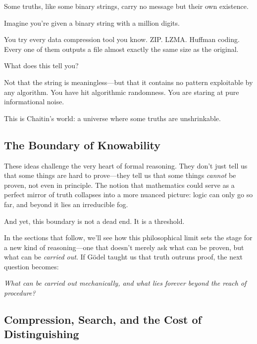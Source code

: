 Some truths, like some binary strings, carry no message but their own existence.

\begin{tcolorbox}[colback=gray!5!white, colframe=black!75!white, title={Compression Test: A Thought Experiment}]
Imagine you're given a binary string with a million digits.

You try every data compression tool you know. ZIP. LZMA. Huffman coding. Every one of them outputs a file almost exactly the same size as the original.

What does this tell you?

Not that the string is meaningless—but that it contains no pattern exploitable by any algorithm. You have hit algorithmic randomness. You are staring at pure informational noise.

This is Chaitin’s world: a universe where some truths are unshrinkable.
\end{tcolorbox}


\subsection{The Boundary of Knowability}

These ideas challenge the very heart of formal reasoning. They don’t just tell us that some things are hard to prove—they tell us that some things \emph{cannot} be proven, not even in principle. The notion that mathematics could serve as a perfect mirror of truth collapses into a more nuanced picture: logic can only go so far, and beyond it lies an irreducible fog.

And yet, this boundary is not a dead end. It is a threshold.

In the sections that follow, we’ll see how this philosophical limit sets the stage for a new kind of reasoning—one that doesn’t merely ask what can be proven, but what can be \emph{carried out}. If Gödel taught us that truth outruns proof, the next question becomes:

\begin{center}
    \emph{What can be carried out mechanically, and what lies forever beyond the reach of procedure?}
\end{center}


\subsection{Compression, Search, and the Cost of Distinguishing}

